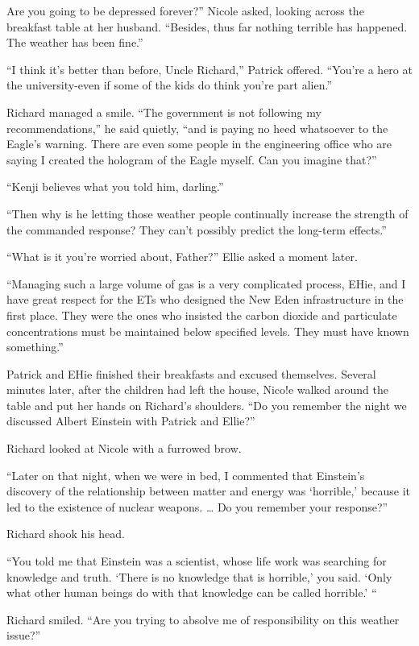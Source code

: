 \documentclass[]{article}
\begin{document}
{Are you going to be depressed forever?” Nicole asked, looking across the breakfast table at her husband. “Besides, thus far nothing terrible has happened. The weather has been fine.”

“I think it’s better than before, Uncle Richard,” Patrick offered. “You’re a hero at the university-even if some of the kids do think you’re part alien.”

Richard managed a smile. “The government is not following my recommendations,” he said quietly, “and is paying no heed whatsoever to the Eagle’s warning. There are even some people in the engineering office who are saying I created the hologram of the Eagle myself. Can you imagine that?”

“Kenji believes what you told him, darling.”

“Then why is he letting those weather people continually increase the strength of the commanded response? They can’t possibly predict the long-term effects.”

“What is it you’re worried about, Father?” Ellie asked a moment later.

“Managing such a large volume of gas is a very complicated process, EHie, and I have great respect for the ETs who designed the New Eden infrastructure in the first place. They were the ones who insisted the carbon dioxide and particulate concentrations must be maintained below specified levels. They must have known something.”

Patrick and EHie finished their breakfasts and excused themselves. Several minutes later, after the children had left the house, Nico!e walked around the table and put her hands on Richard’s shoulders. “Do you remember the night we discussed Albert Einstein with Patrick and Ellie?”

Richard looked at Nicole with a furrowed brow.

“Later on that night, when we were in bed, I commented that Einstein’s discovery of the relationship between matter and energy was ‘horrible,’ because it led to the existence of nuclear weapons. … Do you remember your response?”

Richard shook his head.

“You told me that Einstein was a scientist, whose life work was searching for knowledge and truth. ‘There is no knowledge that is horrible,’ you said. ‘Only what other human beings do with that knowledge can be called horrible.’ “

Richard smiled. “Are you trying to absolve me of responsibility on this weather issue?”

}
\end{document}
